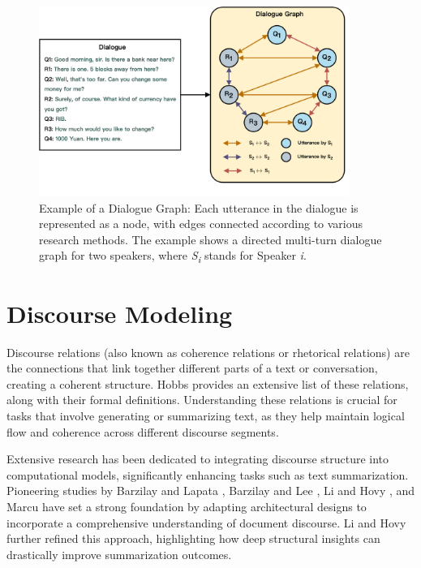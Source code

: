 \begin{figure}[ht]
    \centering
    \includegraphics[width=0.9\textwidth]{./context/related-work/images/dialogue_graph_example.png}
    \caption{Example of a Dialogue Graph: Each utterance in the dialogue is represented as a node, with edges connected according to various research methods. The example shows a directed multi-turn dialogue graph for two speakers, where \textit{S\textsubscript{i}} stands for Speaker \textit{i}.}
    \label{fig:dialogue_graph_example}
\end{figure}

\section{Discourse Modeling} 
Discourse relations (also known as coherence relations or rhetorical relations) are the connections that link together different parts of a text or conversation, creating a coherent structure. Hobbs \cite{hobbs-1979-coherence} \cite{hobbs-1985-coherence} provides an extensive list of these relations, along with their formal definitions. Understanding these relations is crucial for tasks that involve generating or summarizing text, as they help maintain logical flow and coherence across different discourse segments.

Extensive research has been dedicated to integrating discourse structure into computational models, significantly enhancing tasks such as text summarization. Pioneering studies by Barzilay and Lapata \cite{barzilay-lapata-2005-modeling}, Barzilay and Lee \cite{barzilay-lee-2004-catching}, Li and Hovy \cite{li-hovy-2014-model}, and Marcu \cite{marcu-1997-discourse} have set a strong foundation by adapting architectural designs to incorporate a comprehensive understanding of document discourse. Li and Hovy \cite{li-hovy-2014-model} further refined this approach, highlighting how deep structural insights can drastically improve summarization outcomes.

